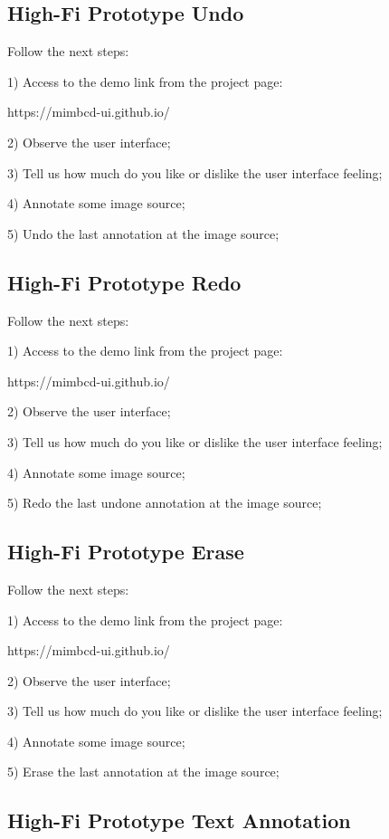 \subsection{High-Fi Prototype Undo}

Follow the next steps:

1) Access to the demo link from the project page:

https://mimbcd-ui.github.io/

2) Observe the user interface;

3) Tell us how much do you like or dislike the user interface feeling;

4) Annotate some image source;

5) Undo the last annotation at the image source;

\subsection{High-Fi Prototype Redo}

Follow the next steps:

1) Access to the demo link from the project page:

https://mimbcd-ui.github.io/

2) Observe the user interface;

3) Tell us how much do you like or dislike the user interface feeling;

4) Annotate some image source;

5) Redo the last undone annotation at the image source;

\subsection{High-Fi Prototype Erase}

Follow the next steps:

1) Access to the demo link from the project page:

https://mimbcd-ui.github.io/

2) Observe the user interface;

3) Tell us how much do you like or dislike the user interface feeling;

4) Annotate some image source;

5) Erase the last annotation at the image source;

\subsection{High-Fi Prototype Text Annotation}

